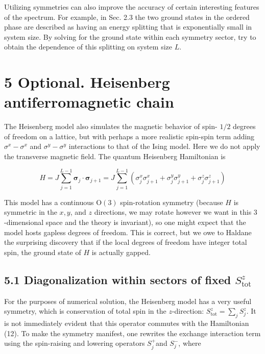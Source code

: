 \documentclass[10pt]{article}
\begin{document}
Utilizing symmetries can also improve the accuracy of certain interesting features of the spectrum. For example, in Sec. 2.3 the two ground states in the ordered phase are described as having an energy splitting that is exponentially small in system size. By solving for the ground state within each symmetry sector, try to obtain the dependence of this splitting on system size $L$.

\section*{5 Optional. Heisenberg antiferromagnetic chain}
The Heisenberg model also simulates the magnetic behavior of spin- $1 / 2$ degrees of freedom on a lattice, but with perhaps a more realistic spin-spin term adding $\sigma^{x}-\sigma^{x}$ and $\sigma^{y}-\sigma^{y}$ interactions to that of the Ising model. Here we do not apply the transverse magnetic field. The quantum Heisenberg Hamiltonian is


\begin{equation*}
H=J \sum_{j=1}^{L-1} \boldsymbol{\sigma}_{j} \cdot \boldsymbol{\sigma}_{j+1}=J \sum_{j=1}^{L-1}\left(\sigma_{j}^{x} \sigma_{j+1}^{x}+\sigma_{j}^{y} \sigma_{j+1}^{y}+\sigma_{j}^{z} \sigma_{j+1}^{z}\right) \tag{12}
\end{equation*}


This model has a continuous $\mathrm{O}(3)$ spin-rotation symmetry (because $H$ is symmetric in the $x, y$, and $z$ directions, we may rotate however we want in this 3 -dimensional space and the theory is invariant), so one might expect that the model hosts gapless degrees of freedom. This is correct, but we owe to Haldane the surprising discovery that if the local degrees of freedom have integer total spin, the ground state of $H$ is actually gapped.

\subsection*{5.1 Diagonalization within sectors of fixed $S_{\text {tot }}^{z}$}
For the purposes of numerical solution, the Heisenberg model has a very useful symmetry, which is conservation of total spin in the $z$-direction: $S_{\mathrm{tot}}^{z}=\sum_{j} S_{j}^{z}$. It is not immediately evident that this operator commutes with the Hamiltonian (12). To make the symmetry manifest, one rewrites the exchange interaction term using the spin-raising and lowering operators $S_{j}^{+}$and $S_{j}^{-}$, where
\end{document}
